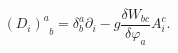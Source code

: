 \begin{equation}
\left( D_{i}\right) _{\;\;b}^{a}=\delta _{b}^{a}\partial _{i}-g\frac{\delta
W_{bc}}{\delta \varphi _{a}}A_{i}^{c}.  \label{i16}
\end{equation}

